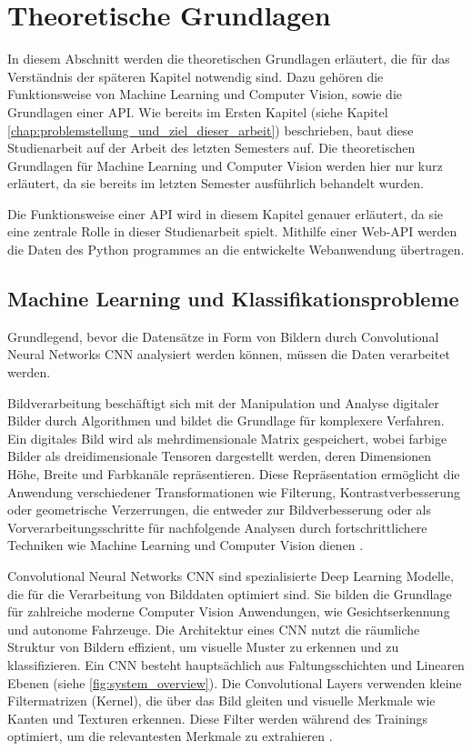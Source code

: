 \chapter{Theoretische Grundlagen} \label{chap:theoretische_grundlagen}  %

In diesem Abschnitt werden die theoretischen Grundlagen erläutert, die für das Verständnis der späteren Kapitel notwendig sind. Dazu gehören die Funktionsweise von Machine Learning und Computer Vision, sowie die Grundlagen einer API.
Wie bereits im Ersten Kapitel (siehe Kapitel \ref{chap:problemstellung_und_ziel_dieser_arbeit}) beschrieben, baut diese Studienarbeit auf der Arbeit des letzten Semesters auf. 
Die theoretischen Grundlagen für Machine Learning und Computer Vision werden hier nur kurz erläutert, da sie bereits im letzten Semester ausführlich behandelt wurden.

Die Funktionsweise einer API wird in diesem Kapitel genauer erläutert, da sie eine zentrale Rolle in dieser Studienarbeit spielt. Mithilfe einer Web-API werden die Daten
des Python programmes an die entwickelte Webanwendung übertragen.

\section{Machine Learning und Klassifikationsprobleme} \label{sec:ml_cv}  %
Grundlegend, bevor die Datensätze in Form von Bildern durch Convolutional Neural Networks \ac{CNN} analysiert werden können, müssen die Daten verarbeitet werden.

Bildverarbeitung beschäftigt sich mit der Manipulation und Analyse digitaler Bilder durch Algorithmen und bildet die Grundlage für komplexere Verfahren. 
Ein digitales Bild wird als mehrdimensionale Matrix gespeichert, wobei farbige Bilder als dreidimensionale Tensoren 
dargestellt werden, deren Dimensionen Höhe, Breite und Farbkanäle repräsentieren. 
Diese Repräsentation ermöglicht die Anwendung verschiedener Transformationen wie Filterung, Kontrastverbesserung oder geometrische Verzerrungen, die 
entweder zur Bildverbesserung oder als Vorverarbeitungsschritte für nachfolgende Analysen durch fortschrittlichere Techniken wie Machine Learning und Computer Vision dienen \cite{finbridgede_computer_2022}.

Convolutional Neural Networks \ac{CNN} sind spezialisierte Deep Learning Modelle, die für die Verarbeitung von Bilddaten optimiert sind. Sie bilden die Grundlage für zahlreiche moderne Computer Vision Anwendungen, wie Gesichtserkennung und autonome Fahrzeuge. 
Die Architektur eines CNN nutzt die räumliche Struktur von Bildern effizient, um visuelle Muster zu erkennen und zu klassifizieren.
Ein CNN besteht hauptsächlich aus Faltungsschichten und Linearen Ebenen (siehe \autoref{fig:system_overview}). 
Die Convolutional Layers verwenden kleine Filtermatrizen (Kernel), die über das Bild gleiten und visuelle Merkmale wie Kanten und Texturen erkennen. 
Diese Filter werden während des Trainings optimiert, um die relevantesten Merkmale zu extrahieren \cite{finbridgede_computer_2022} \cite{intel_convolutional_nodate}.

